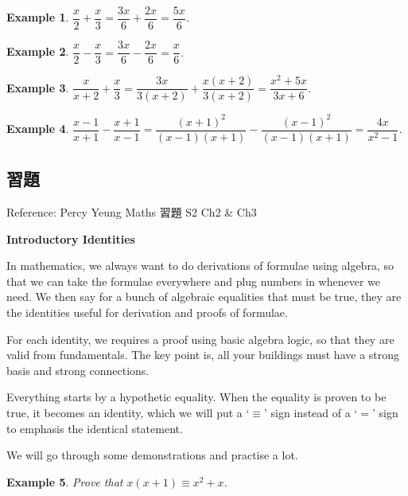 \documentclass[12pt]{article}
\newtheorem{example}{Example}
\begin{document}
    \begin{example}
        $\dfrac{x}{2}+\dfrac{x}{3}=\dfrac{3x}{6}+\dfrac{2x}{6}=\dfrac{5x}{6}$.
    \end{example}

    \begin{example}
        $\dfrac{x}{2}-\dfrac{x}{3}=\dfrac{3x}{6}-\dfrac{2x}{6}=\dfrac{x}{6}$.
    \end{example}

    \begin{example}
        $\dfrac{x}{x+2}+\dfrac{x}{3}=\dfrac{3x}{3(x+2)}+\dfrac{x(x+2)}{3(x+2)}=\dfrac{x^2+5x}{3x+6}$.
    \end{example}

    \begin{example}
        $\dfrac{x-1}{x+1}-\dfrac{x+1}{x-1}=\dfrac{(x+1)^2}{(x-1)(x+1)}-\dfrac{(x-1)^2}{(x-1)(x+1)}=\dfrac{4x}{x^2-1}$.
    \end{example}

    \subsection*{習題}
    Reference: Percy Yeung Maths 習題 S2 Ch2 \& Ch3

    \begin{center}
        \textbf{Introductory Identities}
    \end{center}

    In mathematics, we always want to do derivations of formulae using algebra, so that we can take the formulae everywhere and plug numbers in whenever we need. We then say for a bunch of algebraic equalities that must be true, they are the identities useful for derivation and proofs of formulae.

    For each identity, we requires a proof using basic algebra logic, so that they are valid from fundamentals. The key point is, all your buildings must have a strong basis and strong connections.

    Everything starts by a hypothetic equality. When the equality is proven to be true, it becomes an identity, which we will put a `$\equiv$' sign instead of a `$=$' sign to emphasis the identical statement.

    We will go through some demonstrations and practise a lot.

    \begin{example}
        Prove that $x(x+1)\equiv x^2+x$.
    \end{example}
\end{document}
